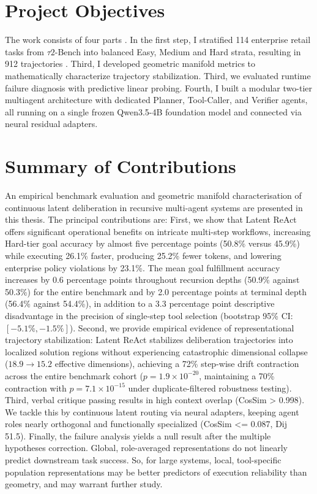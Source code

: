\documentclass[a4paper, 12pt]{report}
\begin{document}
\section{Project Objectives}
The work consists of four parts . In the first step, I stratified 114 enterprise retail tasks from $\tau2$-Bench into balanced Easy, Medium and Hard strata, resulting in 912 trajectories . Third, I developed geometric manifold metrics to mathematically characterize trajectory stabilization. Third, we evaluated runtime failure diagnosis with predictive linear probing. Fourth, I built a modular two-tier multiagent architecture with dedicated Planner, Tool-Caller, and Verifier agents, all running on a single frozen Qwen3.5-4B foundation model and connected via neural residual adapters.

\section{Summary of Contributions}
An empirical benchmark evaluation and geometric manifold characterisation of continuous latent deliberation in recursive multi-agent systems are presented in this thesis. The principal contributions are:
First, we show that Latent ReAct offers significant operational benefits on intricate multi-step workflows, increasing Hard-tier goal accuracy by almost five percentage points (50.8\% versus 45.9\%) while executing 26.1\% faster, producing 25.2\% fewer tokens, and lowering enterprise policy violations by 23.1\%. The mean goal fulfillment accuracy increases by 0.6 percentage points throughout recursion depths (50.9\% against 50.3\%) for the entire benchmark and by 2.0 percentage points at terminal depth (56.4\% against 54.4\%), in addition to a 3.3 percentage point descriptive disadvantage in the precision of single-step tool selection (bootstrap 95\% CI: $[-5.1\%, -1.5\%]$).
Second, we provide empirical evidence of representational trajectory stabilization: Latent ReAct stabilizes deliberation trajectories into localized solution regions without experiencing catastrophic dimensional collapse ($18.9 \to 15.2$ effective dimensions), achieving a 72\% step-wise drift contraction across the entire benchmark cohort ($p = 1.9 \times 10^{-20}$, maintaining a 70\% contraction with $p = 7.1 \times 10^{-15}$ under duplicate-filtered robustness testing).
Third, verbal critique passing results in high context overlap (CosSim > 0.998). We tackle this by continuous latent routing via neural adapters, keeping agent roles nearly orthogonal and functionally specialized (CosSim <= 0.087, Dij ~ 51.5). Finally, the failure analysis yields a null result after the multiple hypotheses correction. Global, role-averaged representations do not linearly predict downstream task success. So, for large systems, local, tool-specific population representations may be better predictors of execution reliability than geometry, and may warrant further study.
\end{document}
